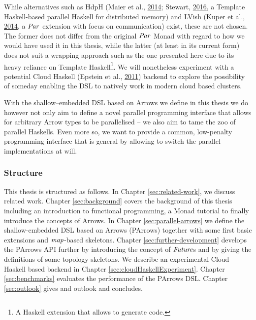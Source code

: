 \documentclass[paper=A4,twoside=true,openright,parskip=full,chapterprefix=true,headings=normal,bibliography=totoc,listof=totoc,titlepage=on,captions=tableabove,draft=false,british]{scrreprt}%
\begin{document}
While alternatives such as HdpH (Maier et al.,
\protect\hyperlink{ref-Maier:2014:HDS:2775050.2633363}{2014}; Stewart,
\protect\hyperlink{ref-stewart_maier_trinder_2016}{2016}, a Template
Haskell-based parallel Haskell for distributed memory) and LVish (Kuper
et al., \protect\hyperlink{ref-Kuper:2014:TPE:2666356.2594312}{2014}, a
\ensuremath{\Conid{Par}} extension with focus on communication) exist, these are not
chosen. The former does not differ from the original \ensuremath{\Conid{Par}} Monad with
regard to how we would have used it in this thesis, while the latter (at
least in its current form) does not suit a wrapping approach such as the
one presented here due to its heavy reliance on Template
Haskell\footnote{A Haskell extension that allows to generate code.}. We
will nonetheless experiment with a potential Cloud Haskell (Epstein et
al., \protect\hyperlink{ref-Epstein:2011:THC:2096148.2034690}{2011})
backend to explore the possibility of someday enabling the DSL to
natively work in modern cloud based clusters.

With the shallow--embedded DSL based on Arrows we define in this thesis
we do however not only aim to define a novel parallel programming
interface that allows for arbitrary Arrow types to be parallelised -- we
also aim to tame the zoo of parallel Haskells. Even more so, we want to
provide a common, low-penalty programming interface that is general by
allowing to switch the parallel implementations at will.

\hypertarget{structure}{%
\subsubsection{Structure}\label{structure}}

This thesis is structured as follows. In Chapter \ref{sec:related-work},
we discuss related work. Chapter \ref{sec:background} covers the
background of this thesis including an introduction to functional
programming, a Monad tutorial to finally introduce the concepts of
Arrows. In Chapter \ref{sec:parallel-arrows} we define the
shallow-embedded DSL based on Arrows (PArrows) together with some first
basic extensions and \ensuremath{\Varid{map}}-based skeletons. Chapter
\ref{sec:further-development} develops the PArrows API further by
introducing the concept of \ensuremath{\Conid{Future}}s and by giving the definitions of
some topology skeletons. We describe an experimental Cloud Haskell based
backend in Chapter \ref{sec:cloudHaskellExperiment}. Chapter
\ref{sec:benchmarks} evaluates the performance of the PArrows DSL.
Chapter \ref{sec:outlook} gives and outlook and concludes.
\end{document}

